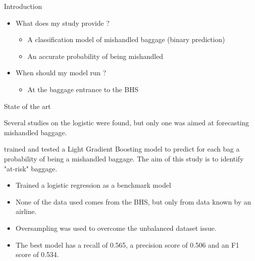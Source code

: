 \documentclass{beamer}
\begin{document}
    
\begin{frame}{Introduction} 
    \begin{itemize}
        \item What does my study provide ? 
            \begin{itemize}
                \item A classification model of mishandled baggage (binary prediction)
                \item An accurate probability of being mishandled
            \end{itemize}
        \item When should my model run ? 
            \begin{itemize}
                \item At the baggage entrance to the BHS
            \end{itemize}
    \end{itemize}    
\end{frame}



\begin{frame}{State of the art} 

Several studies on the logistic were found, but only one was aimed at forecasting mishandled baggage.\hfill \break

\cite{MishandledBgas} trained and tested a Light Gradient Boosting model to predict for each bag a probability of being a mishandled baggage. The aim of this study is to identify "at-risk" baggage. \hfill \break
\begin{itemize}
    \item Trained a logistic regression as a benchmark model
    \item None of the data used comes from the BHS, but only from data known by an airline.
    \item Oversampling was used to overcome the unbalanced dataset issue.
    \item The best model has a recall of 0.565, a precision score of 0.506 and an F1 score of 0.534.
\end{itemize}
\end{frame}
\end{document}
